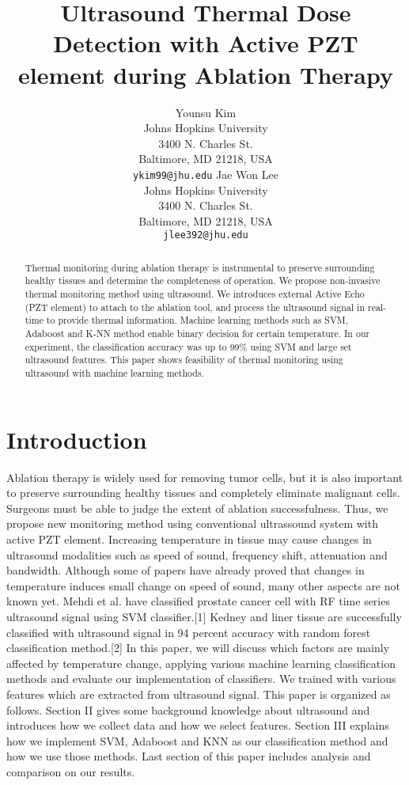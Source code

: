 \documentclass[11pt,letterpaper]{article}
\title{Ultrasound Thermal Dose Detection with Active PZT element during Ablation Therapy}
\author{Younsu Kim\\
  Johns Hopkins University\\
  3400 N. Charles St.\\
  Baltimore, MD 21218, USA\\
  {\tt ykim99@jhu.edu}
  \And
  Jae Won Lee\\
  Johns Hopkins University \\
  3400 N. Charles St. \\
  Baltimore, MD 21218, USA\\
  {\tt jlee392@jhu.edu}}
\date{}
\begin{document}
\maketitle
\begin{abstract}

Thermal monitoring during ablation therapy is instrumental to preserve surrounding healthy tissues and determine the completeness of operation. We propose non-invasive thermal monitoring method using ultrasound. We introduces external Active Echo (PZT element) to attach to the ablation tool, and process the ultrasound signal in real-time to provide thermal information. Machine learning methods such as SVM, Adaboost and K-NN method enable binary decision for certain temperature. In our experiment, the classification accuracy was up to 99\% using SVM and large set ultrasound features. This paper shows feasibility of thermal monitoring using ultrasound with machine learning methods.  

\end{abstract}

\section{Introduction}

Ablation therapy is widely used for removing tumor cells, but it is also important to preserve surrounding healthy tissues and completely eliminate malignant cells. Surgeons must be able to judge the extent of ablation successfulness. Thus, we propose new monitoring method using conventional ultrassound system with active PZT element. Increasing temperature in tissue may cause changes in ultrasound modalities such as speed of sound, frequency shift, attenuation and bandwidth. Although some of papers have already proved that changes in temperature induces small change on speed of sound, many other aspects are not known yet. Mehdi et al. have classified prostate cancer cell with RF time series ultrasound signal using SVM classifier.[1] Kedney and liner tissue are successfully classified with ultrasound signal in 94 percent accuracy with random forest classification method.[2] In this paper, we will discuss which factors are mainly affected by temperature change, applying various machine learning classification methods and evaluate our implementation of classifiers. We trained with various features which are extracted from ultrasound signal. This paper is organized as follows. Section II gives some background knowledge about ultrasound and introduces how we collect data and how we select features. Section III explains how we implement SVM, Adaboost and KNN as our classification method and how we use those methods. Last section of this paper includes analysis and comparison on our results. 
\end{document}
